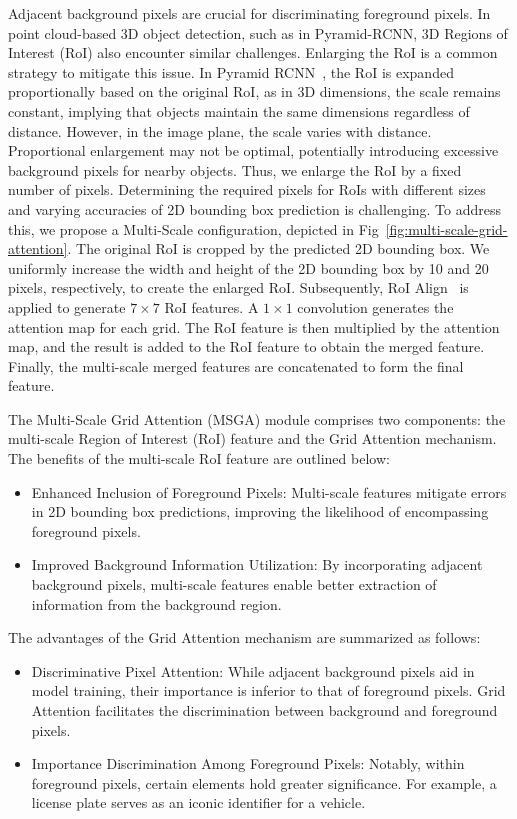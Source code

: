 \documentclass[journal]{IEEEtran}
\begin{document}
	Adjacent background pixels are crucial for discriminating foreground pixels. In point cloud-based 3D object detection, such as in Pyramid-RCNN, 3D Regions of Interest (RoI) also encounter similar challenges. Enlarging the RoI is a common strategy to mitigate this issue. In Pyramid RCNN~\cite{pyramid-rcnn}, the RoI is expanded proportionally based on the original RoI, as in 3D dimensions, the scale remains constant, implying that objects maintain the same dimensions regardless of distance. However, in the image plane, the scale varies with distance. Proportional enlargement may not be optimal, potentially introducing excessive background pixels for nearby objects. Thus, we enlarge the RoI by a fixed number of pixels. Determining the required pixels for RoIs with different sizes and varying accuracies of 2D bounding box prediction is challenging. To address this, we propose a Multi-Scale configuration, depicted in Fig~\ref{fig:multi-scale-grid-attention}. The original RoI is cropped by the predicted 2D bounding box. We uniformly increase the width and height of the 2D bounding box by 10 and 20 pixels, respectively, to create the enlarged RoI. Subsequently, RoI Align~\cite{mask-rcnn} is applied to generate $7\times 7$ RoI features. A $1\times 1$ convolution generates the attention map for each grid. The RoI feature is then multiplied by the attention map, and the result is added to the RoI feature to obtain the merged feature. Finally, the multi-scale merged features are concatenated to form the final feature.

The Multi-Scale Grid Attention (MSGA) module comprises two components: the multi-scale Region of Interest (RoI) feature and the Grid Attention mechanism. The benefits of the multi-scale RoI feature are outlined below:
\begin{itemize}
	\item Enhanced Inclusion of Foreground Pixels: Multi-scale features mitigate errors in 2D bounding box predictions, improving the likelihood of encompassing foreground pixels.
	\item Improved Background Information Utilization: By incorporating adjacent background pixels, multi-scale features enable better extraction of information from the background region.
\end{itemize}

The advantages of the Grid Attention mechanism are summarized as follows:
\begin{itemize}
	\item Discriminative Pixel Attention: While adjacent background pixels aid in model training, their importance is inferior to that of foreground pixels. Grid Attention facilitates the discrimination between background and foreground pixels.
	\item Importance Discrimination Among Foreground Pixels: Notably, within foreground pixels, certain elements hold greater significance. For example, a license plate serves as an iconic identifier for a vehicle.
\end{itemize}
\end{document}
